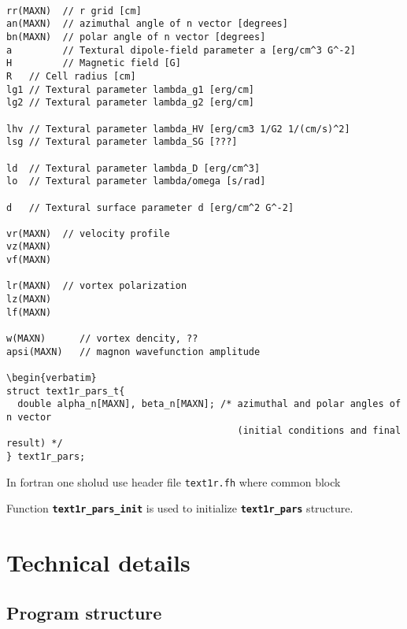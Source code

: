 \documentclass[a4paper]{article}
\begin{document}
\begin{verbatim}

rr(MAXN)  // r grid [cm]
an(MAXN)  // azimuthal angle of n vector [degrees]
bn(MAXN)  // polar angle of n vector [degrees]
a         // Textural dipole-field parameter a [erg/cm^3 G^-2]
H         // Magnetic field [G]
R   // Cell radius [cm]
lg1 // Textural parameter lambda_g1 [erg/cm]
lg2 // Textural parameter lambda_g2 [erg/cm]

lhv // Textural parameter lambda_HV [erg/cm3 1/G2 1/(cm/s)^2]
lsg // Textural parameter lambda_SG [???]

ld  // Textural parameter lambda_D [erg/cm^3]
lo  // Textural parameter lambda/omega [s/rad]

d   // Textural surface parameter d [erg/cm^2 G^-2]

vr(MAXN)  // velocity profile
vz(MAXN)
vf(MAXN)

lr(MAXN)  // vortex polarization
lz(MAXN)
lf(MAXN)

w(MAXN)      // vortex dencity, ??
apsi(MAXN)   // magnon wavefunction amplitude

\begin{verbatim}
struct text1r_pars_t{
  double alpha_n[MAXN], beta_n[MAXN]; /* azimuthal and polar angles of n vector
                                         (initial conditions and final result) */
} text1r_pars;
\end{verbatim}

In fortran one sholud use header file {\tt text1r.fh} where common block

Function {\tt\bf text1r\_pars\_init} is used to initialize {\tt\bf text1r\_pars}
structure.

\eject
\section*{Technical details}

\subsection*{Program structure}
\end{document}
